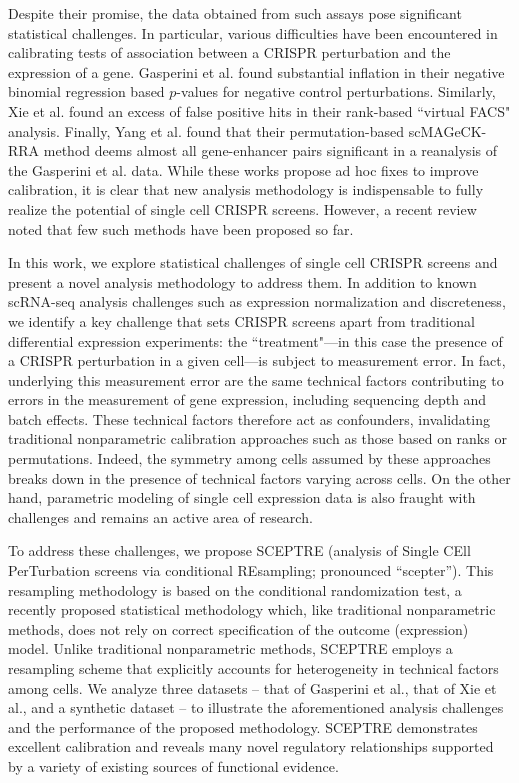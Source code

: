 \documentclass{nature}
\begin{document}
Despite their promise, the data obtained from such assays pose significant statistical challenges. In particular, various difficulties have been encountered in calibrating tests of association between a CRISPR perturbation and the expression of a gene. Gasperini et al.\cite{Gasperini2019} found substantial inflation in their negative binomial regression based $p$-values for negative control perturbations. Similarly, Xie et al.\cite{Xie2019} found an excess of false positive hits in their rank-based ``virtual FACS" analysis. Finally, Yang et al.\cite{Yang2020} found that their permutation-based scMAGeCK-RRA method deems almost all gene-enhancer pairs significant in a reanalysis of the Gasperini et al. data. While these works propose ad hoc fixes to improve calibration, it is clear that new analysis methodology is indispensable to fully realize the potential of single cell CRISPR screens. However, a recent review\cite{Lin2020} noted that few such methods have been proposed so far. 

In this work, we explore statistical challenges of single cell CRISPR screens and present a novel analysis methodology to address them. In addition to known scRNA-seq analysis challenges such as expression normalization and discreteness\cite{Townes2019,Hafemeister2019,Svensson2020}, we identify a key challenge that sets CRISPR screens apart from traditional differential expression experiments: the ``treatment"---in this case the presence of a CRISPR perturbation in a given cell---is subject to measurement error\cite{Dixit2016,Hill2018,Replogle2020}. In fact, underlying this measurement error are the same technical factors contributing to errors in the measurement of gene expression, including sequencing depth and batch effects. These technical factors therefore act as confounders, invalidating traditional nonparametric calibration approaches such as those based on ranks or permutations. Indeed, the symmetry among cells assumed by these approaches breaks down in the presence of technical factors varying across cells. On the other hand, parametric modeling of single cell expression data is also fraught with challenges and remains an active area of research.

To address these challenges, we propose SCEPTRE (analysis of Single CEll PerTurbation screens via conditional REsampling; pronounced ``scepter''). This resampling methodology is based on the conditional randomization test\cite{CetL16}, a recently proposed statistical methodology which, like traditional nonparametric methods, does not rely on correct specification of the outcome (expression) model. Unlike traditional nonparametric methods, SCEPTRE employs a resampling scheme that explicitly accounts for heterogeneity in technical factors among cells. We analyze three datasets -- that of Gasperini et al.\cite{Gasperini2019}, that of Xie et al.\cite{Xie2019}, and a synthetic dataset -- to illustrate the aforementioned analysis challenges and the performance of the proposed methodology. SCEPTRE demonstrates excellent calibration and reveals many novel regulatory relationships supported by a variety of existing sources of functional evidence.
\end{document}
